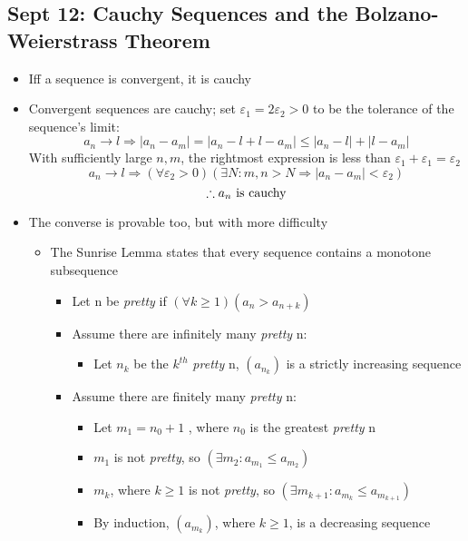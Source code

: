 \documentclass[10pt, oneside]{article}
\let\leq\leqslant
\let\geq\geqslant
\begin{document}
\subsection{Sept 12: Cauchy Sequences and the Bolzano-Weierstrass Theorem}
\begin{itemize}
    \item Iff a sequence is convergent, it is cauchy
    \item Convergent sequences are cauchy; set $\varepsilon_1 = 2\varepsilon_2 > 0$ to be the tolerance of the sequence's limit:
        \[a_n \rightarrow l \Rightarrow |a_n - a_m| = |a_n -l +l - a_m| \leq |a_n - l| + |l - a_m|\]
    With sufficiently large $n,m$, the rightmost expression is less than $\varepsilon_1 + \varepsilon_1 = \varepsilon_2$
        \[a_n \rightarrow l \Rightarrow (\forall \varepsilon_2 > 0)(\exists N : m,n > N \Rightarrow |a_n - a_m| < \varepsilon_2)\]
        \[\therefore a_n \ {\rm is \ cauchy}\]
    \item The converse is provable too, but with more difficulty
    \begin{itemize}
        \item The Sunrise Lemma states that every sequence contains a monotone subsequence
        \begin{itemize}
            \item Let n be {\it pretty} if $(\forall k \geq 1)(a_n > a_{n+k})$
            \item Assume there are infinitely many {\it pretty} n:
            \begin{itemize}
                \item Let $n_k$ be the $k^{th}$ {\it pretty} n, $(a_{n_k})$ is a strictly increasing sequence 
            \end{itemize}
            \item Assume there are finitely many {\it pretty} n:
            \begin{itemize}
                \item Let $m_1 = n_0 + 1$ , where $n_0$ is the greatest {\it pretty} n
                \item $m_1$ is not {\it pretty}, so $(\exists m_2 : a_{m_1} \leq a_{m_2})$
                \item $m_k$, where $k \geq 1$ is not {\it pretty}, so $(\exists m_{k+1} : a_{m_{k}} \leq a_{m_{k+1}})$
                \item By induction, $(a_{m_k})$, where $k \geq 1$, is a decreasing sequence
            \end{itemize}

\end{itemize}
\end{itemize}
\end{itemize}
\end{document}
